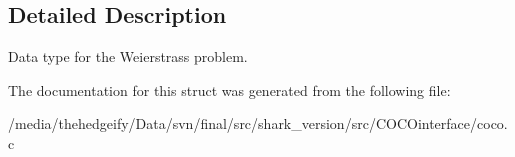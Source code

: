 \subsection{Detailed Description}
Data type for the Weierstrass problem. 

The documentation for this struct was generated from the following file\+:\begin{DoxyCompactItemize}
\item 
/media/thehedgeify/\+Data/svn/final/src/shark\+\_\+version/src/\+C\+O\+C\+Ointerface/coco.\+c\end{DoxyCompactItemize}
